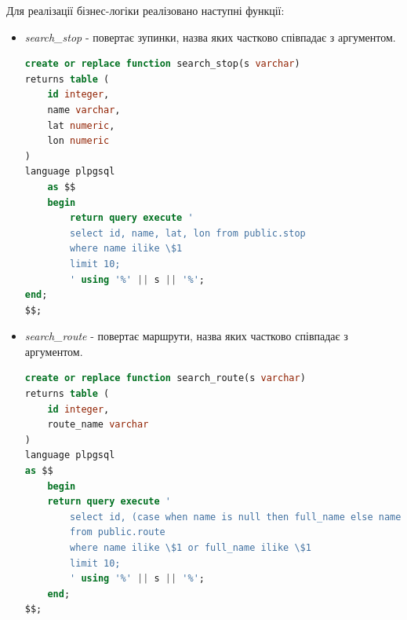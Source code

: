 \documentclass[oneside,14pt]{extarticle}
\begin{document}
Для реалізації бізнес-логіки реалізовано наступні функції:
\begin{itemize}
\item \textit{search\_stop} - повертає зупинки, назва яких частково співпадає з аргументом.
{\fontsize{8pt}{8pt}\selectfont\begin{lstlisting}[language=sql]
create or replace function search_stop(s varchar)
returns table (
	id integer,
	name varchar,
	lat numeric,
	lon numeric
)
language plpgsql
	as $$
	begin
		return query execute '
		select id, name, lat, lon from public.stop
		where name ilike \$1
		limit 10;
		' using '%' || s || '%';
end;
$$;
\end{lstlisting}}
\item \textit{search\_route} - повертає маршрути, назва яких частково співпадає з аргументом.
{\fontsize{8pt}{8pt}\selectfont\begin{lstlisting}[language=sql]
create or replace function search_route(s varchar)
returns table (
	id integer,
	route_name varchar
)
language plpgsql
as $$
	begin
	return query execute '
		select id, (case when name is null then full_name else name end) as route_name
		from public.route
		where name ilike \$1 or full_name ilike \$1
		limit 10;
		' using '%' || s || '%';
	end;
$$;
\end{lstlisting}}
\end{itemize}
\end{document}
